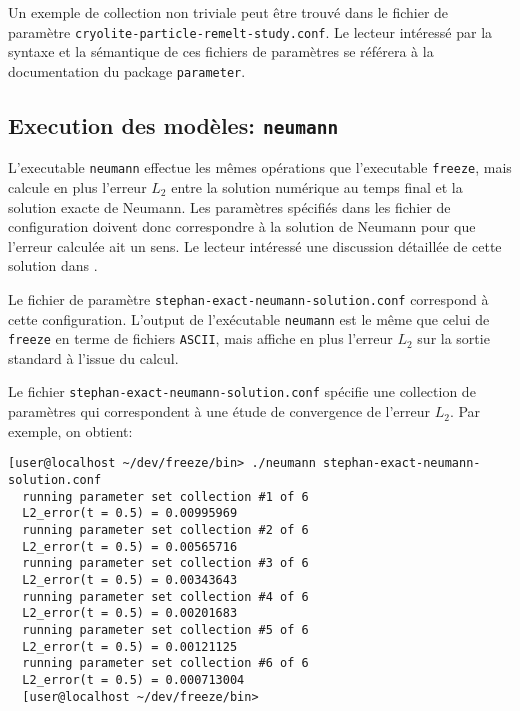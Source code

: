 Un exemple de collection non triviale peut \^etre trouv\'e dans le
fichier de param\`etre
\texttt{cryolite-particle-remelt-study.conf}. Le lecteur int\'eress\'e
par la syntaxe et la s\'emantique de ces fichiers de param\`etres se
r\'ef\'erera \`a la documentation du package \texttt{parameter}.

\subsection{Execution des mod\`eles: \texttt{neumann}}
L'executable \texttt{neumann} effectue les m\^emes op\'erations que
l'executable \texttt{freeze}, mais calcule en plus l'erreur $L_2$
entre la solution num\'erique au temps final et la solution exacte de
Neumann. Les param\`etres sp\'ecifi\'es dans les fichier de
configuration doivent donc correspondre \`a la solution de Neumann
pour que l'erreur calcul\'ee ait un sens. Le lecteur int\'eress\'e une
discussion d\'etaill\'ee de cette solution dans \cite{Hill1987}.

Le fichier de param\`etre \texttt{stephan-exact-neumann-solution.conf}
correspond \`a cette configuration. L'output de l'ex\'ecutable
\texttt{neumann} est le m\^eme que celui de \texttt{freeze} en terme de
fichiers \texttt{ASCII}, mais affiche en plus l'erreur $L_2$ sur la
sortie standard \`a l'issue du calcul.

Le fichier \texttt{stephan-exact-neumann-solution.conf} sp\'ecifie une
collection de param\`etres qui correspondent \`a une \'etude de
convergence de l'erreur $L_2$. Par exemple, on obtient:
\begin{lstlisting}[language={},frame=single,basicstyle=\ttfamily\footnotesize]
  [user@localhost ~/dev/freeze/bin> ./neumann stephan-exact-neumann-solution.conf
  running parameter set collection #1 of 6
  L2_error(t = 0.5) = 0.00995969
  running parameter set collection #2 of 6
  L2_error(t = 0.5) = 0.00565716
  running parameter set collection #3 of 6
  L2_error(t = 0.5) = 0.00343643
  running parameter set collection #4 of 6
  L2_error(t = 0.5) = 0.00201683
  running parameter set collection #5 of 6
  L2_error(t = 0.5) = 0.00121125
  running parameter set collection #6 of 6
  L2_error(t = 0.5) = 0.000713004    
  [user@localhost ~/dev/freeze/bin>
\end{lstlisting}
